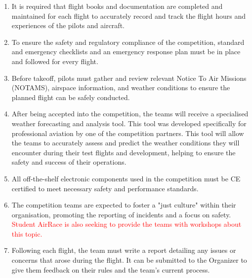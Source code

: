 \documentclass{article}
\begin{document}
\begin{enumerate}
  \item It is required that flight books and documentation are completed and maintained for each flight to accurately record and track the flight hours and experiences of the pilots and aircraft.
  \item To ensure the safety and regulatory compliance of the competition, standard and emergency checklists and an emergency response plan must be in place and followed for every flight.
  \item Before takeoff, pilots must gather and review relevant Notice To Air Missions (NOTAMS), airspace information, and weather conditions to ensure the planned flight can be safely conducted.
  \item After being accepted into the competition, the teams will receive a specialised weather forecasting and analysis tool. This tool was developed specifically for professional aviation by one of the competition partners. 
  This tool will allow the teams to accurately assess and predict the weather conditions they will encounter during their test flights and development, helping to ensure the safety and success of their operations. 
  \item All off-the-shelf electronic components used in the competition must be CE certified to meet necessary safety and performance standards.
  \item The competition teams are expected to foster a "just culture" within their organisation, promoting the reporting of incidents and a focus on safety. \textcolor{red}{Student AirRace is also seeking to provide the teams with workshops about this topic.}
  \item Following each flight, the team must write a report detailing any issues or concerns that arose during the flight. It can be submitted to the Organizer to give them feedback on their rules and the team's current process.
\end{enumerate}
\end{document}
